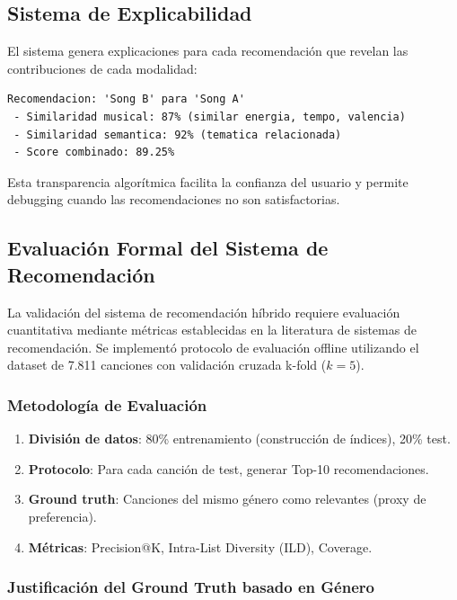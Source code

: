 \subsection{Sistema de Explicabilidad}
\label{subsec:explicabilidad}

El sistema genera explicaciones para cada recomendación que revelan las contribuciones de cada modalidad:

\begin{lstlisting}[caption={Ejemplo de explicación de recomendación}, label={lst:explicacion}]
Recomendacion: 'Song B' para 'Song A'
 - Similaridad musical: 87% (similar energia, tempo, valencia)
 - Similaridad semantica: 92% (tematica relacionada)
 - Score combinado: 89.25%
\end{lstlisting}

Esta transparencia algorítmica facilita la confianza del usuario y permite debugging cuando las recomendaciones no son satisfactorias.

\subsection{Evaluación Formal del Sistema de Recomendación}
\label{subsec:evaluacion-formal}

La validación del sistema de recomendación híbrido requiere evaluación cuantitativa mediante métricas establecidas en la literatura de sistemas de recomendación. Se implementó protocolo de evaluación offline utilizando el dataset de 7.811 canciones con validación cruzada k-fold ($k=5$).

\subsubsection{Metodología de Evaluación}

\begin{enumerate}
    \item \textbf{División de datos}: 80\% entrenamiento (construcción de índices), 20\% test.
    \item \textbf{Protocolo}: Para cada canción de test, generar Top-10 recomendaciones.
    \item \textbf{Ground truth}: Canciones del mismo género como relevantes (proxy de preferencia).
    \item \textbf{Métricas}: Precision@K, Intra-List Diversity (ILD), Coverage.
\end{enumerate}

\subsubsection{Justificación del Ground Truth basado en Género}

